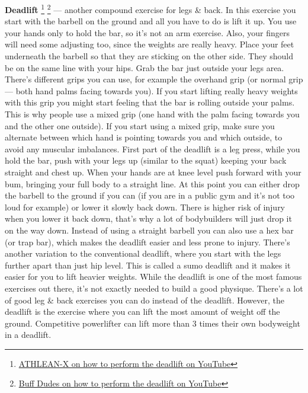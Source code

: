 \documentclass[openany, 12pt]{book}
\begin{document}
        \textbf{Deadlift}
        \footnote{\href{https://www.youtube.com/watch?v=hCDzSR6bW10}{ATHLEAN-X on how to perform the deadlift on YouTube}}
        \footnote{\href{https://www.youtube.com/watch?v=-4qRntuXBSc}{Buff Dudes on how to perform the deadlift on YouTube}}
        --- another compound exercise for legs \& back. In this exercise you start with the barbell on the ground and all you have to do is lift it up.
        You use your hands only to hold the bar, so it's not an arm exercise. Also, your fingers will need some adjusting too, since the weights are really heavy.
        Place your feet underneath the barbell so that they are sticking on the other side. They should be on the same line with your hips. Grab the bar just outside your legs area. 
        There's different grips you can use, for example the overhand grip (or normal grip --- both hand palms facing towards you).
        If you start lifting really heavy weights with this grip you might start feeling that the
        bar is rolling outside your palms. This is why people use a mixed grip (one hand with the palm facing towards you and the other one outside). If you start using a mixed grip,
        make sure you alternate between which hand is pointing towards you and which outside, to avoid any muscular imbalances.
        First part of the deadlift is a leg press, while you hold the bar, push with your legs up (similar to the squat) keeping your back straight and chest up. When your hands are at knee level
        push forward with your bum, bringing your full body to a straight line. At this point you can either drop the barbell to the ground if you can (if you are in a public gym and it's not too loud
        for example) or lower it slowly back down. There is higher risk of injury when you lower it back down, that's why a lot of bodybuilders will just drop it on the way down.
        Instead of using a straight barbell you can also use a hex bar (or trap bar), which makes the deadlift easier and less prone to injury. There's another variation to the conventional deadlift,
        where you start with the legs further apart than just hip level. This is called a sumo deadlift and it makes it easier for you to lift heavier weights.
        While the deadlift is one of the most famous exercises out there, it's not exactly needed to build a good physique. There's a lot of good leg \& back exercises you can do instead
        of the deadlift. However, the deadlift is the exercise where you can lift the most amount of weight off the ground. Competitive powerlifter can lift more than 3 times their own bodyweight in a
        deadlift.
\end{document}
